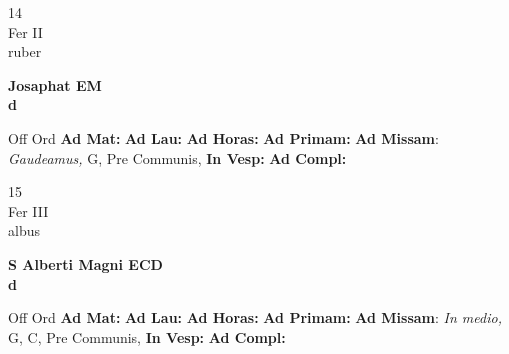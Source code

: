 \documentclass[10pt, openany]{book}
\begin{document}
    \begin{center}
        \begin{minipage}{3.5in}
            \vspace{2em}
            \begin{minipage}{0.5in}
                {\Huge 14} \\
                {\normalsize Fer II} \\
                {\normalsize ruber}
            \end{minipage}
            \begin{minipage}{3.0in}
                \textbf{ \large Josaphat EM \\
                \textnormal{\normalsize d}} \\ 
            \end{minipage}
            \begin{justify}Off Ord
                \textbf{Ad Mat: }
                \textbf{Ad Lau: }
                \textbf{Ad Horas: }
                \textbf{Ad Primam: }\textbf{Ad Missam}: \textit{Gaudeamus,} G, Pre Communis,  
                \textbf{In Vesp: }
                \textbf{Ad Compl: }
            \end{justify}
        \end{minipage}
    \end{center}

    \begin{center}
        \begin{minipage}{3.5in}
            \vspace{2em}
            \begin{minipage}{0.5in}
                {\Huge 15} \\
                {\normalsize Fer III} \\
                {\normalsize albus}
            \end{minipage}
            \begin{minipage}{3.0in}
                \textbf{ \large S Alberti Magni ECD \\
                \textnormal{\normalsize d}} \\ 
            \end{minipage}
            \begin{justify}Off Ord
                \textbf{Ad Mat: }
                \textbf{Ad Lau: }
                \textbf{Ad Horas: }
                \textbf{Ad Primam: }\textbf{Ad Missam}: \textit{In medio,} G, C, Pre Communis,  
                \textbf{In Vesp: }
                \textbf{Ad Compl: }
            \end{justify}
        \end{minipage}
    \end{center}
\end{document}

